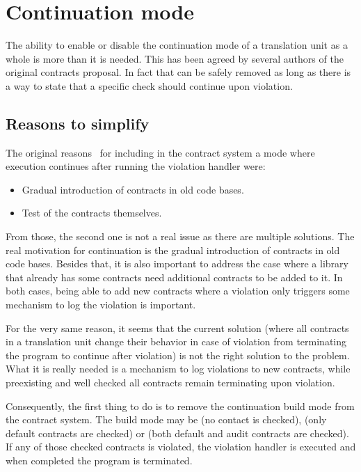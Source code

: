 \section{Continuation mode}
\label{sec:continue}

The ability to enable or disable the continuation mode of a translation unit as
a whole is more than it is needed. This has been agreed by several authors of
the original contracts proposal. In fact that can be safely removed as long as
there is a way to state that a specific check should continue upon violation.

\subsection{Reasons to simplify}

The original reasons~\cite{p0380r0} for including in the contract system a mode where execution
continues after running the violation handler were:

\begin{itemize}

	\item Gradual introduction of contracts in old code bases.
	\item Test of the contracts themselves.

\end{itemize}

From those, the second one is not a real issue as there are multiple solutions.
The real motivation for continuation is the gradual introduction of contracts in
old code bases. Besides that, it is also important to address the case where a library
that already has some contracts need additional contracts to be added to it.
In both cases, being able to add new contracts where a violation only triggers
some mechanism to log the violation is important.

For the very same reason, it seems that the current solution (where all contracts in
a translation unit change their behavior in case of violation from terminating the 
program to continue after violation) is not the right solution to the problem.
What it is really needed is a mechanism to log violations to new contracts, while
preexisting and well checked all contracts remain terminating upon violation.

Consequently, the first thing to do is to remove the continuation build mode
from the contract system. The build mode may be  (no contact is checked),
 (only default contracts are checked) or 
(both default and audit contracts are checked). If any of those checked contracts
is violated, the violation handler is executed and when completed the program
is terminated.

